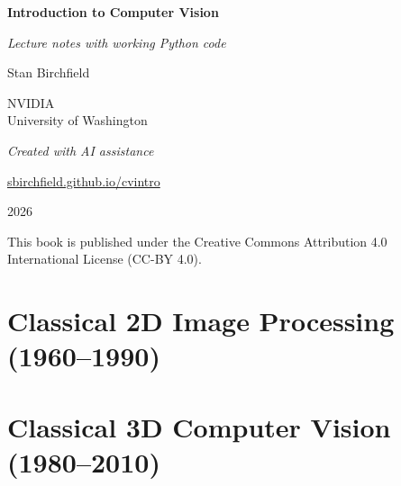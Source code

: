 \documentclass[11pt,oneside]{book}
\begin{document}
\frontmatter

\begin{titlepage}
\centering
\vspace*{3.2cm}
{\Huge\bfseries Introduction to Computer Vision}\par
\vspace{0.7cm}
{\Large\itshape\color{gray!55!black} Lecture notes with working Python code}\par
\vspace{2.4cm}
{\Large Stan Birchfield}\par
\vspace{0.9cm}
{\normalsize\color{gray!45!black} NVIDIA\\University of Washington}\par
\vspace{2.6cm}
{\small\itshape\color{gray!45!black} Created with AI assistance}\par
\vspace{0.5cm}
\href{https://sbirchfield.github.io/cvintro}{\small\ttfamily sbirchfield.github.io/cvintro}\par
\vfill
{\normalsize 2026}\par
\vspace{8pt}
{\small\color{gray!45!black} This book is published under the Creative Commons Attribution 4.0\\
International License (CC-BY 4.0).}\par
\vspace*{2.2cm}
\end{titlepage}

\tableofcontents



\mainmatter
\part{Classical 2D Image Processing (1960--1990)}





















\part{Classical 3D Computer Vision (1980--2010)}
\end{document}
